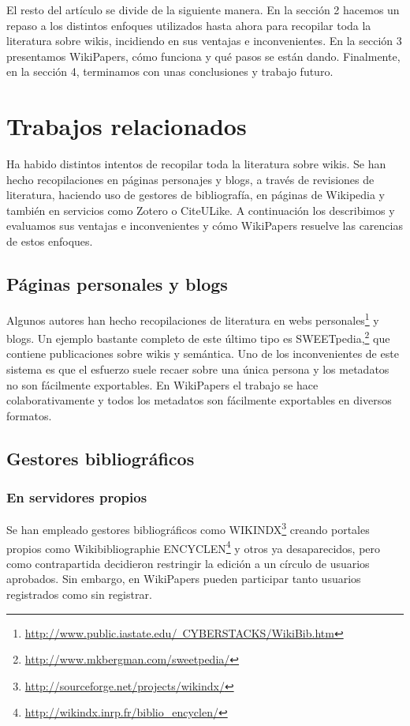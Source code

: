 \documentclass[11pt,twocolumn]{article}
\begin{document}
El resto del artículo se divide de la siguiente manera. En la sección 2 hacemos un repaso a los distintos enfoques utilizados hasta ahora para recopilar toda la literatura sobre wikis, incidiendo en sus ventajas e inconvenientes. En la sección 3 presentamos WikiPapers, cómo funciona y qué pasos se están dando. Finalmente, en la sección 4, terminamos con unas conclusiones y trabajo futuro.

\section{Trabajos relacionados}
Ha habido distintos intentos de recopilar toda la literatura sobre wikis. Se han hecho recopilaciones en páginas personajes y blogs, a través de revisiones de literatura, haciendo uso de gestores de bibliografía, en páginas de Wikipedia y también en servicios como Zotero o CiteULike. A continuación los describimos y evaluamos sus ventajas e inconvenientes y cómo WikiPapers resuelve las carencias de estos enfoques.

\subsection{Páginas personales y blogs}
Algunos autores han hecho recopilaciones de literatura en webs personales\footnote{\href{http://www.public.iastate.edu/~CYBERSTACKS/WikiBib.htm}{http://www.public.iastate.edu/~CYBERSTACKS/WikiBib.htm}} y blogs. Un ejemplo bastante completo de este último tipo es SWEETpedia,\footnote{\href{http://www.mkbergman.com/sweetpedia/}{http://www.mkbergman.com/sweetpedia/}} que contiene publicaciones sobre wikis y semántica. Uno de los inconvenientes de este sistema es que el esfuerzo suele recaer sobre una única persona y los metadatos no son fácilmente exportables. En WikiPapers el trabajo se hace colaborativamente y todos los metadatos son fácilmente exportables en diversos formatos.

\subsection{Gestores bibliográficos}

\subsubsection{En servidores propios}
Se han empleado gestores bibliográficos como WIKINDX\footnote{\href{http://sourceforge.net/projects/wikindx/}{http://sourceforge.net/projects/wikindx/}} creando portales propios como Wikibibliographie ENCYCLEN\footnote{\href{http://wikindx.inrp.fr/biblio_encyclen/}{http://wikindx.inrp.fr/biblio\_encyclen/}} y otros ya desaparecidos, pero como contrapartida decidieron restringir la edición a un círculo de usuarios aprobados. Sin embargo, en WikiPapers pueden participar tanto usuarios registrados como sin registrar.
\end{document}
